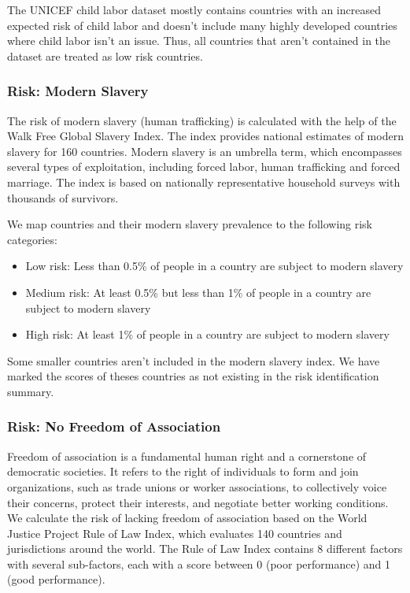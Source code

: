 \documentclass{article}
\begin{document}
The UNICEF child labor dataset mostly contains countries with an increased expected risk of child labor and doesn't include many highly developed countries
where child labor isn't an issue. Thus, all countries that aren't contained in the dataset are treated as low risk countries. 

\subsubsection*{Risk: Modern Slavery}

The risk of modern slavery (human trafficking) is calculated with the help of the Walk Free Global Slavery Index. The index provides national estimates of modern slavery for 160
countries. Modern slavery is an umbrella term, which encompasses several types of exploitation, including forced labor, human trafficking and forced marriage.
The index is based on nationally representative household surveys with thousands of survivors.

We map countries and their modern slavery prevalence to the following risk categories:
\begin{itemize}
    \item Low risk: Less than 0.5\% of people in a country are subject to modern slavery
    \item Medium risk: At least 0.5\% but less than 1\% of people in a country are subject to modern slavery
    \item High risk: At least 1\% of people in a country are subject to modern slavery
\end{itemize}

Some smaller countries aren't included in the modern slavery index. We have marked the scores of theses countries as not existing in the risk identification summary.

\subsubsection*{Risk: No Freedom of Association}

Freedom of association is a fundamental human right and a cornerstone of democratic societies. It refers to the right of individuals to form and join organizations,
such as trade unions or worker associations, to collectively voice their concerns, protect their interests, and negotiate better working conditions.
We calculate the risk of lacking freedom of association based on the World Justice Project Rule of Law Index, which evaluates 140 countries and jurisdictions
around the world. The Rule of Law Index contains 8 different factors with several sub-factors, each with a score between 0 (poor performance) and 1 (good performance).
\end{document}
